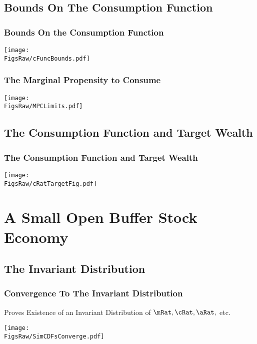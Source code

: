 \documentclass[pdflatex]{beamer}\providecommand{\texname}{BufferStockTheory-Slides}%
\providecommand{\FigsRaw}{\econtexRoot/Code/Python/Figures}
\begin{document}
\subsection{Bounds On The Consumption Function}
\begin{frame}
\frametitle{Bounds On the Consumption Function}
\centerline{\texttt{[image: \\FigsRaw/cFuncBounds.pdf]}}
\end{frame}

\begin{frame}
\frametitle{The Marginal Propensity to Consume}
\centerline{\texttt{[image: \\FigsRaw/MPCLimits.pdf]}}
\end{frame}

\subsection{The Consumption Function and Target Wealth}
\begin{frame}
\frametitle{The Consumption Function and Target Wealth}
\centerline{\texttt{[image: \\FigsRaw/cRatTargetFig.pdf]}}
\end{frame}



\section{A Small Open Buffer Stock Economy}

\subsection{The Invariant Distribution}
\begin{frame}
\frametitle{Convergence To The Invariant Distribution}

\cite{szeidlInvariant} Proves Existence of an Invariant Distribution of 
$\mRat, \cRat, \aRat,$ etc.

\centerline{\texttt{[image: \\FigsRaw/SimCDFsConverge.pdf]}}



\end{frame}
\end{document}
